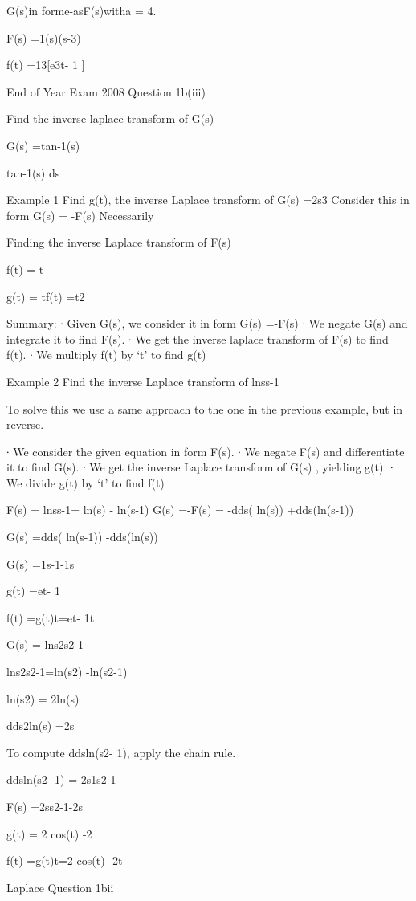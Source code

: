 G(s)in forme-asF(s)witha = 4.


F(s) =1(s)(s-3)


f(t) =13[e3t- 1 ]

End of Year Exam  2008 Question 1b(iii)

Find the inverse laplace transform of G(s)

G(s) =tan-1(s)

tan-1(s) ds


Example 1
Find g(t), the inverse Laplace transform of G(s) =2s3
Consider this in form G(s) = -F(s)
Necessarily 
 
Finding the inverse Laplace transform of F(s)
 
f(t) = t
 

g(t) = tf(t) =t2
 
Summary:
∙       Given G(s), we consider it in form G(s) =-F(s)
∙       We negate G(s) and integrate it to find F(s).
∙       We get the inverse laplace transform of F(s) to find f(t).
∙       We multiply f(t) by ‘t’ to find g(t)
 
Example 2
Find the inverse Laplace transform of lnss-1
 
To solve this we use a same approach to the one in the previous example, but in reverse.
 
∙       We consider the given equation in form F(s).
∙       We negate F(s) and differentiate it to find G(s).
∙       We get the inverse Laplace transform of G(s) , yielding g(t).
∙       We divide g(t) by ‘t’ to find f(t)
 
 F(s) = lnss-1= ln(s) - ln(s-1)      	 
G(s) =-F(s) = -dds( ln(s)) +dds(ln(s-1))

G(s) =dds( ln(s-1)) -dds(ln(s))

G(s) =1s-1-1s

g(t) =et- 1

f(t) =g(t)t=et- 1t


 
G(s) = lns2s2-1

 lns2s2-1=ln(s2) -ln(s2-1)

ln(s2) = 2ln(s)


dds2ln(s) =2s


To compute  ddsln(s2- 1), apply the chain rule.


ddsln(s2- 1) = 2s1s2-1 

 F(s) =2ss2-1-2s


 g(t) = 2 cos(t) -2

f(t) =g(t)t=2 cos(t) -2t

Laplace Question 1bii
 
